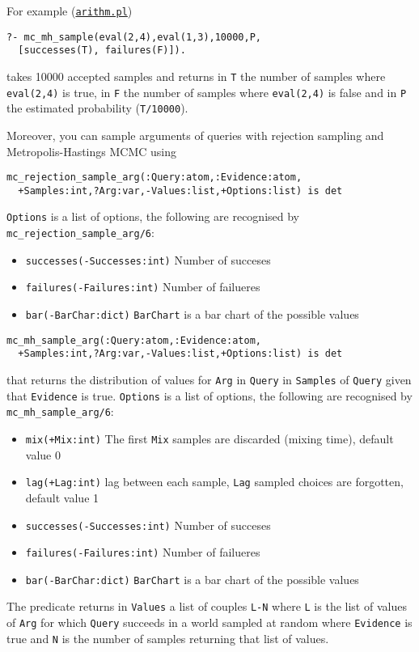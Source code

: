 For example (\href{http://cplint.eu/example/inference/arithm.pl}{\texttt{arithm.pl}})
\begin{verbatim}
?- mc_mh_sample(eval(2,4),eval(1,3),10000,P,
  [successes(T), failures(F)]).
\end{verbatim}
takes 10000 accepted samples and returns in \verb|T| the number of samples where
\verb|eval(2,4)| is true, in \verb|F| the number of samples where \verb|eval(2,4)| is false and in \verb|P| the
estimated probability (\verb|T/10000|).


Moreover, you can sample arguments of queries with rejection sampling and Metropolis-Hastings MCMC using
\begin{verbatim}
mc_rejection_sample_arg(:Query:atom,:Evidence:atom,
  +Samples:int,?Arg:var,-Values:list,+Options:list) is det
\end{verbatim}
\verb|Options| is a list of options, the following are recognised by \verb|mc_rejection_sample_arg/6|:
\begin{itemize}
\item \verb|successes(-Successes:int)|
Number of succeses
\item \verb|failures(-Failures:int)|
Number of failueres
\item \verb|bar(-BarChar:dict)|
    \verb|BarChart| is a bar chart of the possible values
\end{itemize}
\begin{verbatim}
mc_mh_sample_arg(:Query:atom,:Evidence:atom,
  +Samples:int,?Arg:var,-Values:list,+Options:list) is det
\end{verbatim}
that returns the distribution of values for \verb|Arg| in \verb|Query| in \verb|Samples| of
\verb|Query| given that \verb|Evidence| is true.
\verb|Options| is a list of options, the following are recognised by \verb|mc_mh_sample_arg/6|:
\begin{itemize}
\item \verb|mix(+Mix:int)|
The first  \verb|Mix| samples are discarded (mixing time), default value 0
\item \verb|lag(+Lag:int)|
lag between each sample, \verb|Lag| sampled choices are forgotten, default value 1
\item \verb|successes(-Successes:int)|
Number of succeses
\item \verb|failures(-Failures:int)|
Number of failueres
\item \verb|bar(-BarChar:dict)|
    \verb|BarChart| is a bar chart of the possible values
\end{itemize}
The predicate returns in \verb|Values| a list of couples \verb|L-N| where
\verb|L| is the list of values of \verb|Arg| for which \verb|Query|
succeeds in a world sampled at random where \verb|Evidence| is true and \verb|N|
is the number of samples returning that list of values.

